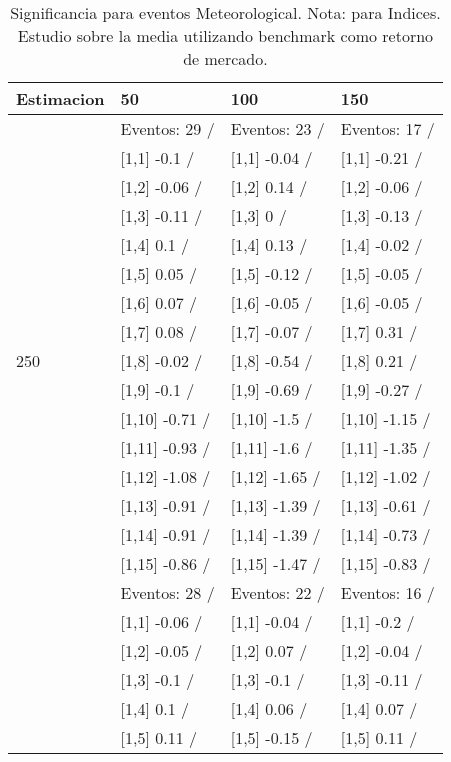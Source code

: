 \begin{table}

\caption{Significancia para eventos Meteorological. Nota: para Indices. Estudio sobre la media utilizando benchmark como retorno de mercado.}
\centering
\begin{tabular}[t]{llll}
\toprule
Estimacion & 50 & 100 & 150\\
\midrule
 & Eventos:  29 / & Eventos:  23 / & Eventos:  17 /\\
 & {}[1,1] -0.1  / & {}[1,1] -0.04  / & {}[1,1] -0.21  /\\
 & {}[1,2] -0.06  / & {}[1,2] 0.14  / & {}[1,2] -0.06  /\\
 & {}[1,3] -0.11  / & {}[1,3] 0  / & {}[1,3] -0.13  /\\
 & {}[1,4] 0.1  / & {}[1,4] 0.13  / & {}[1,4] -0.02  /\\
\addlinespace
 & {}[1,5] 0.05  / & {}[1,5] -0.12  / & {}[1,5] -0.05  /\\
 & {}[1,6] 0.07  / & {}[1,6] -0.05  / & {}[1,6] -0.05  /\\
 & {}[1,7] 0.08  / & {}[1,7] -0.07  / & {}[1,7] 0.31  /\\
250 & {}[1,8] -0.02  / & {}[1,8] -0.54  / & {}[1,8] 0.21  /\\
 & {}[1,9] -0.1  / & {}[1,9] -0.69  / & {}[1,9] -0.27  /\\
\addlinespace
 & {}[1,10] -0.71  / & {}[1,10] -1.5  / & {}[1,10] -1.15  /\\
 & {}[1,11] -0.93  / & {}[1,11] -1.6  / & {}[1,11] -1.35  /\\
 & {}[1,12] -1.08  / & {}[1,12] -1.65  / & {}[1,12] -1.02  /\\
 & {}[1,13] -0.91  / & {}[1,13] -1.39  / & {}[1,13] -0.61  /\\
 & {}[1,14] -0.91  / & {}[1,14] -1.39  / & {}[1,14] -0.73  /\\
\addlinespace
 & {}[1,15] -0.86  / & {}[1,15] -1.47  / & {}[1,15] -0.83  /\\
 & Eventos:  28 / & Eventos:  22 / & Eventos:  16 /\\
 & {}[1,1] -0.06  / & {}[1,1] -0.04  / & {}[1,1] -0.2  /\\
 & {}[1,2] -0.05  / & {}[1,2] 0.07  / & {}[1,2] -0.04  /\\
 & {}[1,3] -0.1  / & {}[1,3] -0.1  / & {}[1,3] -0.11  /\\
\addlinespace
 & {}[1,4] 0.1  / & {}[1,4] 0.06  / & {}[1,4] 0.07  /\\
 & {}[1,5] 0.11  / & {}[1,5] -0.15  / & {}[1,5] 0.11  /\\

\end{tabular}
\end{table}
